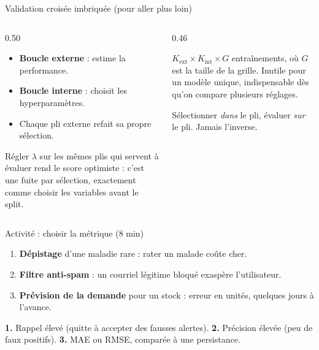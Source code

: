 \begin{frame}{Validation croisée imbriquée (pour aller plus loin)}
\begin{columns}[t]
\begin{column}{0.50\textwidth}
\begin{itemize}
  \item \textbf{Boucle externe} : estime la performance.
  \item \textbf{Boucle interne} : choisit les hyperparamètres.
  \item Chaque pli externe refait sa propre sélection.
\end{itemize}
\begin{wbox}
Régler $\lambda$ sur les mêmes plis qui servent à évaluer rend le score
optimiste : c'est une fuite par sélection, exactement comme choisir les
variables avant le split.
\end{wbox}
\end{column}
\begin{column}{0.46\textwidth}
\begin{solbox}[Coût]
$K_{\text{ext}} \times K_{\text{int}} \times G$ entraînements, où $G$ est la
taille de la grille. Inutile pour un modèle unique, indispensable dès qu'on
compare plusieurs réglages.
\end{solbox}
\begin{kbox}
Sélectionner \emph{dans} le pli, évaluer \emph{sur} le pli. Jamais l'inverse.
\end{kbox}
\end{column}
\end{columns}
\end{frame}

\begin{frame}{Activité : choisir la métrique (8 min)}
\begin{abox}
\begin{enumerate}
  \item \textbf{Dépistage} d'une maladie rare : rater un malade coûte cher.
  \item \textbf{Filtre anti-spam} : un courriel légitime bloqué exaspère
        l'utilisateur.
  \item \textbf{Prévision de la demande} pour un stock : erreur en unités,
        quelques jours à l'avance.
\end{enumerate}
\end{abox}
\vspace{1mm}
\begin{solbox}
\textbf{1.} Rappel élevé (quitte à accepter des fausses alertes).
\textbf{2.} Précision élevée (peu de faux positifs).
\textbf{3.} MAE ou RMSE, comparée à une persistance.
\end{solbox}
\end{frame}

